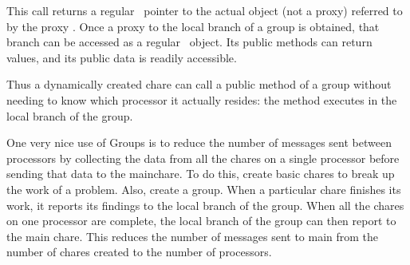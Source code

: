 This call returns a regular \CC\ pointer to the actual object (not a proxy)
referred to by the proxy .  Once a proxy to the
local branch of a group is obtained, that branch can be accessed as a regular
\CC\ object.  Its public methods can return values, and its public data is 
readily accessible.

Thus a dynamically created chare can call a public method of a
group without needing to know which processor it actually resides: the method
executes in the local branch of the group.

One very nice use of Groups is to reduce the number of messages sent between
processors by collecting the data from all the chares on a single processor
before sending that data to the mainchare.  To do this, create basic chares to
break up the work of a problem.  Also, create a group.  When a particular chare
finishes its work, it reports its findings to the local branch of the group.
When all the chares on one processor are complete, the local branch of the
group can then report to the main chare.  This reduces the number of messages
sent to main from the number of chares created to the number of processors. 







